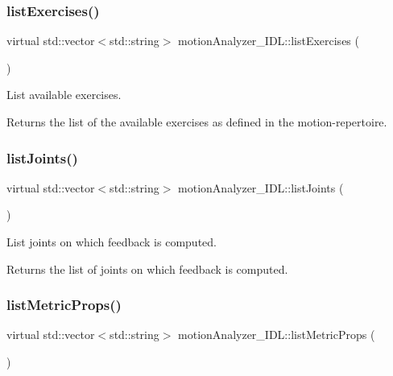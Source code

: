\subsubsection{\texorpdfstring{listExercises()}{listExercises()}}
{\footnotesize\ttfamily virtual std\+::vector$<$std\+::string$>$ motion\+Analyzer\+\_\+\+I\+D\+L\+::list\+Exercises (\begin{DoxyParamCaption}{ }\end{DoxyParamCaption})\hspace{0.3cm}{\ttfamily [virtual]}}



List available exercises. 

\begin{DoxyReturn}{Returns}
the list of the available exercises as defined in the motion-\/repertoire. 
\end{DoxyReturn}
\mbox{\label{classmotionAnalyzer__IDL_aaec274413bf24d3e213ce6cfb2592748}} 
\subsubsection{\texorpdfstring{listJoints()}{listJoints()}}
{\footnotesize\ttfamily virtual std\+::vector$<$std\+::string$>$ motion\+Analyzer\+\_\+\+I\+D\+L\+::list\+Joints (\begin{DoxyParamCaption}{ }\end{DoxyParamCaption})\hspace{0.3cm}{\ttfamily [virtual]}}



List joints on which feedback is computed. 

\begin{DoxyReturn}{Returns}
the list of joints on which feedback is computed. 
\end{DoxyReturn}
\mbox{\label{classmotionAnalyzer__IDL_a05b2616e56207a2acc4dbc4429f56609}} 
\subsubsection{\texorpdfstring{listMetricProps()}{listMetricProps()}}
{\footnotesize\ttfamily virtual std\+::vector$<$std\+::string$>$ motion\+Analyzer\+\_\+\+I\+D\+L\+::list\+Metric\+Props (\begin{DoxyParamCaption}{ }\end{DoxyParamCaption})\hspace{0.3cm}{\ttfamily [virtual]}}



